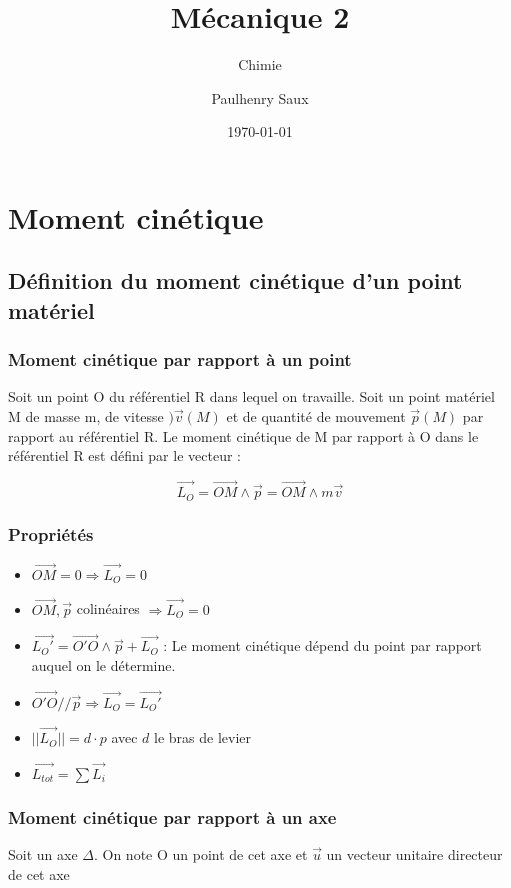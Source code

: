 \documentclass[french]{yLectureNote}
\title{Mécanique 2}
\subtitle{Chimie}
\author{Paulhenry Saux}
\date{\today}
\renewcommand{\vec}{\overrightarrow}
\newcommand{\norm}[1]{||\vec{#1}||}
\begin{document}
\setcounter{chapter}{2}
\chapter{Moment cinétique}
\section{Définition du moment cinétique d’un point matériel}
\subsection{ Moment cinétique par rapport à un point}
Soit un point O du référentiel R dans lequel on travaille.
Soit un point matériel M de masse m, de vitesse \()\vec{v}(M)\) et de quantité de mouvement
\(\vec{p} (M)\) par rapport au référentiel R.
Le moment cinétique de M par rapport à O dans le référentiel R est défini par le
vecteur :
\begin{definition}
\[\vec{L_O} = \vec{OM} \wedge \vec{p} = \vec{OM} \wedge m \vec{v}\]
\end{definition}
\subsection{Propriétés}
\begin{itemize}
 \item \(\vec{OM} = 0 \Rightarrow \vec{L_O} = 0\)
 \item \(\vec{OM}, \vec{p}\) colinéaires \(\Rightarrow \vec{L_O} = 0\)
 \item \(\vec{L_O'} = \vec{O'O}\wedge \vec{p}+\vec{L_O}\) : Le moment cinétique dépend du point par rapport auquel on le détermine.
 \item \(\vec{O'O}//\vec{p} \Rightarrow \vec{L_O} = \vec{L_O'}\)
 \item \(\norm{L_O} = d\cdot p\) avec $d$ le bras de levier
 \item \(\vec{L_{tot}} = \sum \vec{L_i}\)
\end{itemize}
\subsection{Moment cinétique par rapport à un axe}
Soit un axe $\Delta$. On note O un point de cet axe et $\vec{u}$
 un vecteur unitaire directeur de
cet axe
\end{document}
